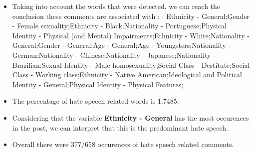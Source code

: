 \documentclass[11pt]{article}
\begin{document}
\begin{itemize}\item Taking into account the words that were detected, we can reach the conclusion these comments are associated with : : Ethnicity - General;Gender - Female sexuality;Ethnicity - Black;Nationality - Portuguese;Physical Identity - Physical (and Mental) Impairments;Ethnicity - White;Nationality - General;Gender - General;Age - General;Age - Youngsters;Nationality - German;Nationality - Chinese;Nationality - Japanese;Nationality - Brazilian;Sexual Identity - Male homosexuality;Social Class - Destitute;Social Class - Working class;Ethnicity - Native American;Ideological and Political Identity - General;Physical Identity - Physical Features;%

\item The percentage of hate speech related words is 1.7485.

\item Considering that the variable \textbf{Ethnicity - General} has the most occurences in the post, we can interpret that this is the predominant hate speech.

\item Overall there were 377/658 occurences of hate speech related comments.\end{itemize}
\end{document}
